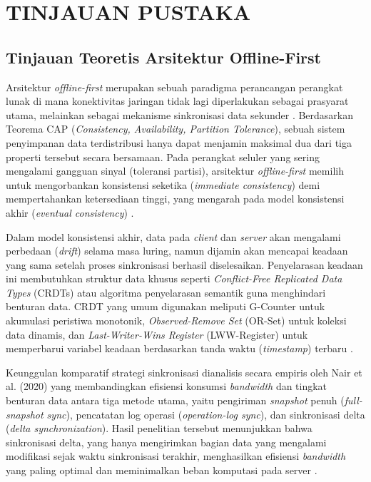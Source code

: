 \chapter{TINJAUAN PUSTAKA}

\section{Tinjauan Teoretis Arsitektur Offline-First}
Arsitektur \textit{offline-first} merupakan sebuah paradigma perancangan perangkat lunak di mana konektivitas jaringan tidak lagi diperlakukan sebagai prasyarat utama, melainkan sebagai mekanisme sinkronisasi data sekunder \cite{researchgate2024_offline}. Berdasarkan Teorema CAP (\textit{Consistency, Availability, Partition Tolerance}), sebuah sistem penyimpanan data terdistribusi hanya dapat menjamin maksimal dua dari tiga properti tersebut secara bersamaan. Pada perangkat seluler yang sering mengalami gangguan sinyal (toleransi partisi), arsitektur \textit{offline-first} memilih untuk mengorbankan konsistensi seketika (\textit{immediate consistency}) demi mempertahankan ketersediaan tinggi, yang mengarah pada model konsistensi akhir (\textit{eventual consistency}) \cite{nair2020offline}.

Dalam model konsistensi akhir, data pada \textit{client} dan \textit{server} akan mengalami perbedaan (\textit{drift}) selama masa luring, namun dijamin akan mencapai keadaan yang sama setelah proses sinkronisasi berhasil diselesaikan. Penyelarasan keadaan ini membutuhkan struktur data khusus seperti \textit{Conflict-Free Replicated Data Types} (CRDTs) atau algoritma penyelarasan semantik guna menghindari benturan data. CRDT yang umum digunakan meliputi G-Counter untuk akumulasi peristiwa monotonik, \textit{Observed-Remove Set} (OR-Set) untuk koleksi data dinamis, dan \textit{Last-Writer-Wins Register} (LWW-Register) untuk memperbarui variabel keadaan berdasarkan tanda waktu (\textit{timestamp}) terbaru \cite{nair2020offline}.

Keunggulan komparatif strategi sinkronisasi dianalisis secara empiris oleh Nair et al. (2020) yang membandingkan efisiensi konsumsi \textit{bandwidth} dan tingkat benturan data antara tiga metode utama, yaitu pengiriman \textit{snapshot} penuh (\textit{full-snapshot sync}), pencatatan log operasi (\textit{operation-log sync}), dan sinkronisasi delta (\textit{delta synchronization}). Hasil penelitian tersebut menunjukkan bahwa sinkronisasi delta, yang hanya mengirimkan bagian data yang mengalami modifikasi sejak waktu sinkronisasi terakhir, menghasilkan efisiensi \textit{bandwidth} yang paling optimal dan meminimalkan beban komputasi pada server \cite{nair2020offline}. 

